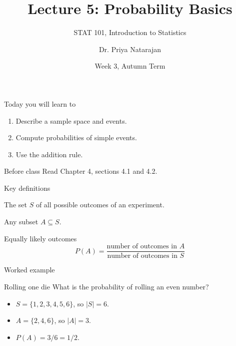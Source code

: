 \documentclass{beamer}
\title{Lecture 5: Probability Basics}
\subtitle{STAT 101, Introduction to Statistics}
\author{Dr. Priya Natarajan}
\date{Week 3, Autumn Term}
\begin{document}
\begin{frame}
  \titlepage
\end{frame}

\begin{frame}{Today you will learn to}
  \begin{enumerate}
    \item Describe a sample space and events.
    \item Compute probabilities of simple events.
    \item Use the addition rule.
  \end{enumerate}
  \vspace{1em}
  \begin{block}{Before class}
    Read Chapter 4, sections 4.1 and 4.2.
  \end{block}
\end{frame}

\begin{frame}{Key definitions}
  \begin{definition}
    The set $S$ of all possible outcomes of an experiment.
  \end{definition}
  \begin{definition}[Event]
    Any subset $A \subseteq S$.
  \end{definition}
  \begin{block}{Equally likely outcomes}
    \[ P(A) = \frac{\text{number of outcomes in } A}{\text{number of outcomes in } S} \]
  \end{block}
\end{frame}

\begin{frame}{Worked example}
  \begin{exampleblock}{Rolling one die}
    What is the probability of rolling an even number?
  \end{exampleblock}
  \pause
  \begin{itemize}
    \item $S = \{1,2,3,4,5,6\}$, so $|S| = 6$.
    \pause
    \item $A = \{2,4,6\}$, so $|A| = 3$.
    \pause
    \item $P(A) = 3/6 = 1/2$.
  \end{itemize}
\end{frame}
\end{document}
